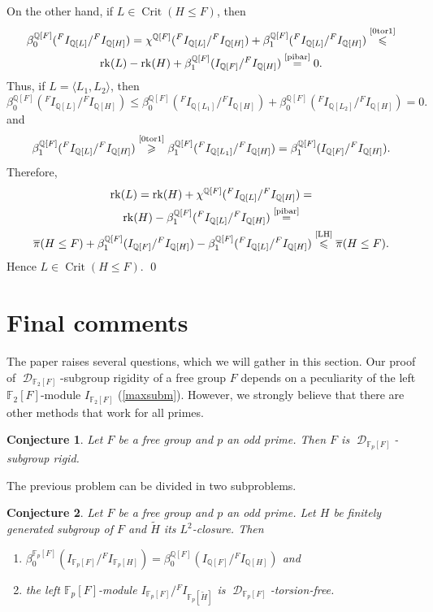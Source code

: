 \documentclass{amsart}
\newtheorem{Conj}{Conjecture}
\theoremstyle{definition}
\theoremstyle{remark}
\DeclareMathOperator{\D}{\mathcal D}
\DeclareMathOperator{\Crit}{Crit}
\DeclareMathOperator{\rk}{rk}
\newcommand{\myeq}[1]{\ensuremath{\stackrel{\text{#1}}{=}}}
\newcommand{\myle}[1]{\ensuremath{\stackrel{\text{#1}}{\leqslant}}}
\newcommand{\myge}[1]{\ensuremath{\stackrel{\text{#1}}{\geqslant}}}
\newcommand{\bpi}{\overline{\pi}}
\newcommand{\F}{\mathbb{F}}
\newcommand{\Q}{\mathbb{Q}}
\begin{document}
On the other hand, if $L\in  \Crit(H\le F)$, then
\begin{multline*}
\beta_0^{\Q[F]}({}^FI_{\Q[L]}/{}^FI_{\Q[H]})=\chi^{\Q[F]}({}^FI_{\Q[L]}/{}^FI_{\Q[H]})
+\beta_1^{\Q[F]}({}^FI_{\Q[L]}/{}^FI_{\Q[H]})\myle{\cref{0tor1}}\\
 \rk(L)-\rk(H)+\beta_1^{\Q[F]}(I_{\Q[F]}/{}^FI_{\Q[H]})\myeq{\cref{pibar}} 0.
 \end{multline*}
Thus, if $L=\langle L_1,L_2\rangle$, then
$$\beta_0^{\Q[F]}({}^FI_{\Q[L]}/{}^FI_{\Q[H]})\le \beta_0^{\Q[F]}({}^FI_{\Q[L_1]}/{}^FI_{\Q[H]})+\beta_0^{\Q[F]}({}^FI_{\Q[L_2]}/{}^FI_{\Q[H]})=0.$$
and
\begin{equation}\label{LH}
\beta_1^{\Q[F]}({}^FI_{\Q[L]}/{}^FI_{\Q[H]})\myge{\cref{0tor1}}\beta_1^{\Q[F]}({}^FI_{\Q[L_1]}/{}^FI_{\Q[H]})=\beta_1^{\Q[F]}( I_{\Q[F]}/{}^FI_{\Q[H]}).\end{equation}
Therefore, 
\begin{multline*}
\rk(L)=\rk(H)+\chi^{\Q[F]}({}^FI_{\Q[L]}/{}^FI_{\Q[H]})=\\
\rk(H)-\beta_1^{\Q[F]}({}^FI_{\Q[L]}/{}^FI_{\Q[H]})\myeq{\cref{pibar}}\\
 \bpi (H\leq F)+\beta_1^{\Q[F]}( I_{\Q[F]}/{}^FI_{\Q[H]})-\beta_1^{\Q[F]}({}^FI_{\Q[L]}/{}^FI_{\Q[H]})\myle{\cref{LH}}  \bpi(H\le F).
\end{multline*}
Hence $L\in \Crit (H\leq F)$.
\qed
 

\section{Final comments}
The paper raises several questions, which we will gather in this section.
Our proof of $\D_{\F_2[F]}$-subgroup rigidity of a free group $F$ depends on a peculiarity of the left  $\F_2[F]$-module $I_{\F_2[F]}$ (\cref{maxsubm}). However, we strongly believe that there are other methods that work for all primes.
\begin{Conj}
Let $F$ be a free group and $p$ an odd prime. Then $ F$ is $\D_{\F_p[F]}$-subgroup rigid. 
\end{Conj}

The previous problem can be divided in two subproblems.
\begin{Conj}
Let $F$ be a free group and $p$ an odd prime. Let $H$ be finitely generated subgroup of $F$ and $\widetilde H$ its $L^2$-closure. Then 
\begin{enumerate}
\item $\beta_0^{\F_p[F]}(I_{\F_p[F]}/{}^FI_{\F_p[H]})=\beta_0^{\Q[F]}(I_{\Q[F]}/{}^FI_{\Q[H]})$ and
\item the left $\F_p[F]$-module $I_{\F_p[F]}/{}^FI_{\F_p[\widetilde H]}$ is $\D_{\F_p[F]}$-torsion-free.
\end{enumerate}
\end{Conj}
\end{document}
